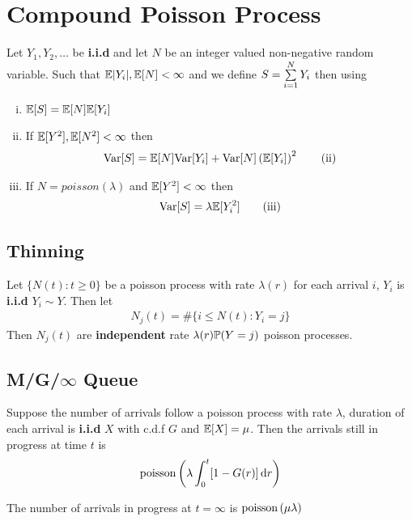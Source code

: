 \documentclass[12pt,a4paper]{article}
\begin{document}
\section{Compound Poisson Process}
\begin{thm}
    Let $Y_1, Y_2, \ldots$ be \textbf{i.i.d} and let $N$ be an integer valued non-negative random variable. Such that $\E|Y_i|, \E[N] < \infty$ and we define $S = \nsum{i=1}{N}Y_i$ then using 
    \begin{enumerate}[(i)]
        \item $\E[S] = \E[N]\E[Y_i]$
        \item If $\E[Y^2], \E[N^2] < \infty$ then 
            \begin{align*}
                \Var[S] = \E[N]\Var[Y_i] + \Var[N]\left(\E[Y_i]\right)^2 \tag{ii}
            \end{align*}
        \item If $N = poisson(\lambda)$ and $\E[Y^2]<\infty$ then 
            \begin{align*}
                \Var[S] = \lambda\E[Y_i^2] \tag{iii}
            \end{align*}
    \end{enumerate} 
\end{thm}
\subsection{Thinning}
\begin{thm}[Thinning]
    Let $\{N(t) : t\geq 0\}$ be a poisson process with rate $\lambda(r)$ for each arrival $i$, $Y_i$ is \textbf{i.i.d} $Y_i \sim Y$. Then let 
    \begin{align*}
        N_j(t) = \#\{i \leq N(t) : Y_i = j\}
    \end{align*}
    Then $N_j(t)$ are \textbf{independent} rate $\lambda(r) \P(Y = j)$ poisson processes. 
\end{thm}
\newpage
\subsection{M/G/$\infty$ Queue}
\begin{thm}[M/G/$\infty$]
    Suppose the number of arrivals follow a poisson process with rate $\lambda$, duration of each arrival is \textbf{i.i.d} $X$ with c.d.f $G$ and $\E[X] = \mu$. Then the arrivals still in progress at time $t$ is 
    \begin{align*}
        \poisson\left(\lambda \int_0^t[1-G(r)]\dd{r}\right)
    \end{align*}
\end{thm}
\begin{cor}[$\infty$]
    The number of arrivals in progress at $t=\infty$ is $\poisson\left(\mu\lambda\right)$ 
\end{cor}
\end{document}
